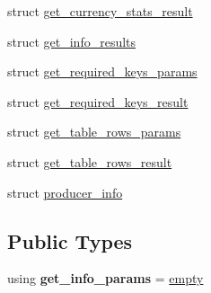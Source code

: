 \begin{DoxyCompactItemize}
\item 
struct \mbox{\hyperlink{structaacio_1_1chain__apis_1_1read__only_1_1get__currency__stats__result}{get\+\_\+currency\+\_\+stats\+\_\+result}}
\item 
struct \mbox{\hyperlink{structaacio_1_1chain__apis_1_1read__only_1_1get__info__results}{get\+\_\+info\+\_\+results}}
\item 
struct \mbox{\hyperlink{structaacio_1_1chain__apis_1_1read__only_1_1get__required__keys__params}{get\+\_\+required\+\_\+keys\+\_\+params}}
\item 
struct \mbox{\hyperlink{structaacio_1_1chain__apis_1_1read__only_1_1get__required__keys__result}{get\+\_\+required\+\_\+keys\+\_\+result}}
\item 
struct \mbox{\hyperlink{structaacio_1_1chain__apis_1_1read__only_1_1get__table__rows__params}{get\+\_\+table\+\_\+rows\+\_\+params}}
\item 
struct \mbox{\hyperlink{structaacio_1_1chain__apis_1_1read__only_1_1get__table__rows__result}{get\+\_\+table\+\_\+rows\+\_\+result}}
\item 
struct \mbox{\hyperlink{structaacio_1_1chain__apis_1_1read__only_1_1producer__info}{producer\+\_\+info}}
\end{DoxyCompactItemize}
\subsection*{Public Types}
\begin{DoxyCompactItemize}
\item 
\mbox{\label{classaacio_1_1chain__apis_1_1read__only_a9d288d87632e085ea8ee17a8eb017dd4}} 
using {\bfseries get\+\_\+info\+\_\+params} = \mbox{\hyperlink{structaacio_1_1chain__apis_1_1empty}{empty}}
\end{DoxyCompactItemize}
